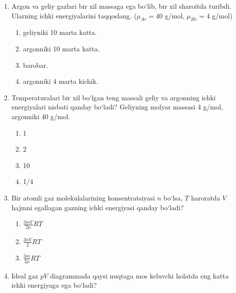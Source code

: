 \begin{enumerate}
\begin{enumerate}[label=\Alph*)]
\end{enumerate}

\item Argon va geliy gazlari bir xil massaga ega bo‘lib, bir xil sharoitda turibdi. Ularning ichki energiyalarini taqqoslang. ($\mu_{Ar}=40$ g/mol, $\mu_{He}=4$ g/mol)
\begin{enumerate}[label=\Alph*)]
\item geliyniki 10 marta katta.
\item argonniki 10 marta katta.
\item barobar.
\item argonniki 4 marta kichik.

\end{enumerate}

\item Temperaturalari bir xil bo‘lgan teng massali geliy va argonning ichki energiyalari nisbati qanday bo‘ladi? Geliyning molyar massasi 4 g/mol, argonniki 40 g/mol.
\begin{enumerate}[label=\Alph*)]
\item 1
\item 2
\item 10
\item 1/4

\end{enumerate}

\item Bir atomli gaz molekulalarining konsentratsiyasi $n$ bo‘lsa, $T$ haroratda $V$ hajmni egallagan gazning ichki energiyasi qanday bo‘ladi?
\begin{enumerate}[label=\Alph*)]
\item $\frac{3mV}{2\mu}RT$
\item $\frac{3nV}{2}RT$
\item $\frac{3m}{2\mu}RT$

\end{enumerate}

\item Ideal gaz $pV$ diagrammada qaysi nuqtaga mos keluvchi holatda eng katta ichki energiyaga ega bo‘ladi?



\end{enumerate}
